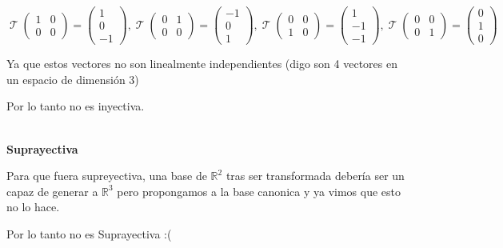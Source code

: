 \documentclass[12pt]{report}                                    %
\DeclareMathOperator \LinealTransformation {\mathcal{T}}        %
\begin{document}
            \begin{equation*}
                \LinealTransformation(\begin{matrix}1&0\\0&0\end{matrix}) = \begin{pmatrix}1\\0\\-1\end{pmatrix}, 
                \LinealTransformation(\begin{matrix}0&1\\0&0\end{matrix}) = \begin{pmatrix}-1\\0\\1\end{pmatrix}, 
                \LinealTransformation(\begin{matrix}0&0\\1&0\end{matrix}) = \begin{pmatrix}1\\-1\\-1\end{pmatrix}, 
                \LinealTransformation(\begin{matrix}0&0\\0&1\end{matrix}) = \begin{pmatrix}0\\1\\0\end{pmatrix} 
            \end{equation*}

            Ya que estos vectores no son linealmente independientes (digo son 4 vectores en un espacio de dimensión 3)

            Por lo tanto no es inyectiva.

            \textbf{\\Suprayectiva}

            Para que fuera supreyectiva, una base de $\mathbb{R}^2$ tras ser transformada debería ser un capaz de
            generar a $\mathbb{R}^3$ pero propongamos a la base canonica y ya vimos que esto no lo hace.

            Por lo tanto no es Suprayectiva :(





    \clearpage
\end{document}
